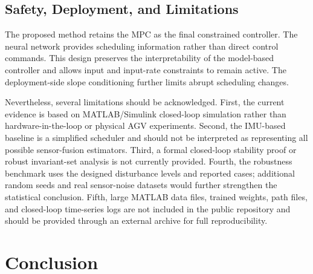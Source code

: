 \documentclass{ieeeaccess}
\begin{document}

\subsection{Safety, Deployment, and Limitations}

The proposed method retains the MPC as the final constrained controller. The neural network provides scheduling information rather than direct control commands. This design preserves the interpretability of the model-based controller and allows input and input-rate constraints to remain active. The deployment-side slope conditioning further limits abrupt scheduling changes.

Nevertheless, several limitations should be acknowledged. First, the current evidence is based on MATLAB/Simulink closed-loop simulation rather than hardware-in-the-loop or physical AGV experiments. Second, the IMU-based baseline is a simplified scheduler and should not be interpreted as representing all possible sensor-fusion estimators. Third, a formal closed-loop stability proof or robust invariant-set analysis is not currently provided. Fourth, the robustness benchmark uses the designed disturbance levels and reported cases; additional random seeds and real sensor-noise datasets would further strengthen the statistical conclusion. Fifth, large MATLAB data files, trained weights, path files, and closed-loop time-series logs are not included in the public repository and should be provided through an external archive for full reproducibility.

\section{Conclusion}

\label{sec:conclusion}
\end{document}
